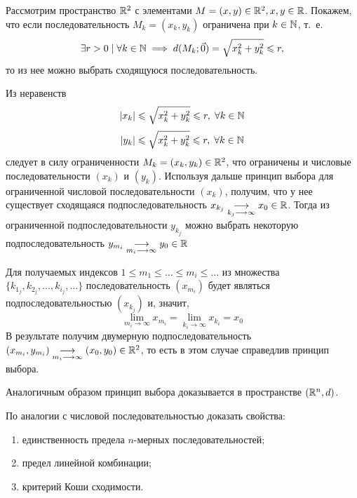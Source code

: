 \documentclass[../../main.tex]{subfiles}
\begin{document}
  \begin{exmp}
    Рассмотрим пространство $\mathbb{R}^2$ с элементами
    $M=(x,y) \in \mathbb{R}^2, x,y \in \mathbb{R}$. 
    Покажем, что если последовательность $M_k=(x_k,y_k)$ ограничена 
    при $k \in \mathbb{N}$, т.~е.
    \[
    \exists r>0 \; | \; \forall k \in \mathbb{N} 
    \implies d(M_k; \vec0)=\sqrt{x^2_k+y^2_k} \leqslant r,
    \]
    то из нее можно выбрать сходящуюся последовательность.
    
    Из неравенств
    \[ 
    |x_k| \leqslant \sqrt{x^2_k+y^2_k}\leqslant r, \; \forall k \in \mathbb{N} 
    \]
    \[ 
    |y_k| \leqslant \sqrt{x^2_k+y^2_k}\leqslant r, \; \forall k \in \mathbb{N} 
    \]
    следует в силу ограниченности $M_k=(x_k,y_k) \in \mathbb{R}^2$, 
    что ограничены и числовые последовательности
    $(x_k)$ и $(y_k)$. 
    Используя дальше принцип выбора для ограниченной 
    числовой последовательности $(x_k)$,
    получим, что у нее существует сходящаяся подпоследовательность
    $x_{k_j}\underset{k_j \longrightarrow \infty}
    {\longrightarrow}x_0 \in \mathbb{R}$.
    Тогда из ограниченной подпоследовательности $y_{k_j}$ 
    можно выбрать некоторую подпоследовательность
    $y_{m_i}\underset{m_i\longrightarrow \infty}
    {\longrightarrow}y_0 \in \mathbb{R}$
    
    Для получаемых индексов $1 \leq m_1 \leq \ldots 
    \leq m_i \leq \ldots $ из множества
    $\{k_{1_j}, k_{2_j}, \dots, k_{i_j}, \dots\}$
    последовательность $ (x_{m_i}) $ будет являться 
    подпоследовательностью $ (x_{k_j}) $ и, значит, 
    \[  \lim_{m_i \to \infty}{x_{m_i}}= 
    \lim_{k_i \to \infty}{x_{k_i}}=  x_0\]
    В результате получим двумерную подпоследовательность 
    $(x_{m_i}, y_{m_i}) \underset{m_i\longrightarrow \infty}
    {\longrightarrow} (x_0, y_0) \in \mathbb{R}^2$,
    то есть в этом случае справедлив принцип выбора.
    
    Аналогичным образом принцип выбора доказывается в пространстве $
    (\mathbb{R}^n, d)$.
  \end{exmp}

  \begin{exc}
    По аналогии с числовой последовательностью
    доказать свойства:
    \begin{enumerate}
      \item единственность  предела $n$-мерных последовательностей;
      \item предел линейной комбинации;
      \item критерий Коши сходимости.
    \end{enumerate}
  \end{exc}
\end{document}
